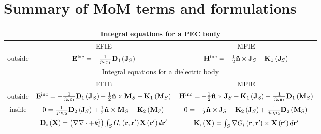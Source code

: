 \chapter{Summary of MoM terms and formulations}
%
\par
\renewcommand{\arraystretch}{2}
\begin{table}[h!]
\centering
\begin{tabular}{|c||c|c|}
  \hline
  \multicolumn{3}{|c|}{Integral equations for a PEC body} \\
  \hline
  \hline
   & EFIE & MFIE \\
  \hline
  outside & $\mathbf{E}^\text{inc} =  - \frac{1}{j \omega \varepsilon_1} \mathbf{D}_1 \left( \mathbf{J}_{S}\right)$ & $\mathbf{H}^\text{inc} = - \frac{1}{2} \mathbf{\hat{n}} \times \mathbf{J}_{S} - \mathbf{K}_1 \left(\mathbf{J}_{S}\right)$ \\
  \hline
  \hline
  \multicolumn{3}{|c|}{Integral equations for a dielectric body} \\
  \hline
  \hline
   & EFIE & MFIE \\
  \hline
  outside & $\mathbf{E}^\text{inc} =  - \frac{1}{j \omega \varepsilon_1} \mathbf{D}_1 \left( \mathbf{J}_{S}\right) + \frac{1}{2} \mathbf{\hat{n}} \times \mathbf{M}_{S} + \mathbf{K}_1 \left(\mathbf{M}_{S}\right)$ & $\mathbf{H}^\text{inc} = - \frac{1}{2} \mathbf{\hat{n}} \times \mathbf{J}_{S} - \mathbf{K}_1 \left(\mathbf{J}_{S}\right) - \frac{1}{j \omega \mu_1} \mathbf{D}_1 \left( \mathbf{M}_{S}\right)$ \\
  \hline
  inside  & $0 = \frac{1}{j \omega \varepsilon_2} \mathbf{D}_2\left(\mathbf{J}_{S}\right) + \frac{1}{2} \mathbf{\hat{n}} \times \mathbf{M}_{S} -  \mathbf{K}_2\left( \mathbf{M}_{S}\right)$ & $0 = - \frac{1}{2} \mathbf{\hat{n}} \times \mathbf{J}_{S} +  \mathbf{K}_2\left( \mathbf{J}_{S}\right) + \frac{1}{j \omega \mu_2} \mathbf{D}_2\left(\mathbf{M}_{S}\right) $ \\
  \hline
  \hline
 & $\mathbf{D}_i\left(\mathbf{X}\right) = \left(\nabla \nabla \cdot + k_i^2\right) \int_{S} G_i\left(\mathbf{r}, \mathbf{r}'\right) \mathbf{X}\left(\mathbf{r}'\right) d\mathbf{r}'$  & $\mathbf{K}_i\left(\mathbf{X}\right) = \int_S \nabla G_i\left(\mathbf{r}, \mathbf{r}'\right) \times \mathbf{X}\left(\mathbf{r}'\right) d\mathbf{r}'$ \\
  \hline
\end{tabular}
\end{table}

